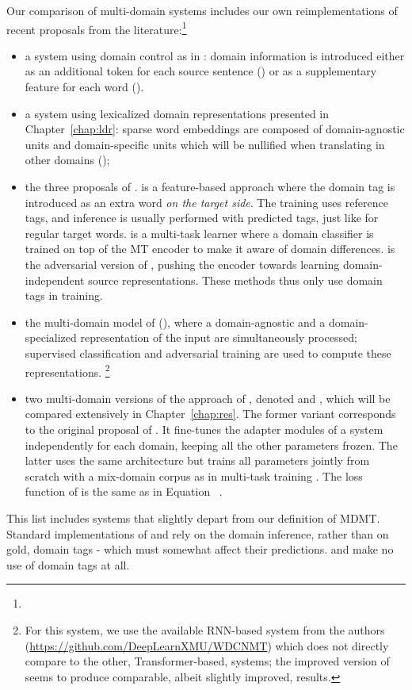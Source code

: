 Our comparison of multi-domain systems includes our own reimplementations of recent proposals from the literature:\footnote{}
\begin{itemize}
\item a system using domain control as in \citet{Kobus17domain}: domain information is introduced either as an additional token for each source sentence () or as a supplementary feature for each word ().
\item a system using lexicalized domain representations presented in Chapter~\ref{chap:ldr}: sparse word embeddings are composed of domain-agnostic units and domain-specific units which will be nullified when translating in other domains ();
\item the three proposals of \citet{Britz17effective}.  is a feature-based approach where the domain tag is introduced as an extra word \textsl{on the target side}. The training uses reference tags, and inference is usually performed with predicted tags, just like for regular target words.  is a multi-task learner where a domain classifier is trained on top of the MT encoder to make it aware of domain differences.  is the adversarial version of , pushing the encoder towards learning domain-independent source representations. These methods thus only use domain tags in training.
\item the multi-domain model of \citet{Zeng18multidomain} (), where a domain-agnostic and a domain-specialized representation of the input are simultaneously processed; supervised classification and adversarial training are used to compute these representations. \footnote{For this system, we use the available RNN-based system from the authors (\url{https://github.com/DeepLearnXMU/WDCNMT}) which does not directly compare to the other, Transformer-based, systems; the improved version of \citet{Su19exploring} seems to produce comparable, albeit slightly improved, results.}
\item two multi-domain versions of the approach of \citet{Bapna19simple}, denoted  and , which will be compared extensively in Chapter~\ref{chap:res}. The former variant corresponds to the original proposal of \citet{Bapna19simple} . It fine-tunes the adapter modules of a  system independently for each domain, keeping all the other parameters frozen. The latter uses the same architecture but trains all parameters jointly from scratch with a mix-domain corpus as in multi-task training \citep{Caruana97multitask}. The loss function of  is the same as in Equation ~.
\end{itemize}
This list includes systems that slightly depart from our definition of MDMT. Standard implementations of  and  rely on the domain inference, rather than on gold, domain tags - which must somewhat affect their predictions.  and  make no use of domain tags at all. 
